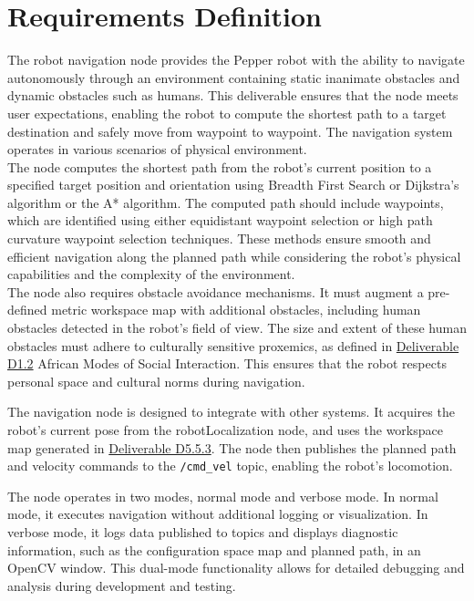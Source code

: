 \documentclass{CSSRforAfrica}
\begin{document}
\newpage

\section{Requirements Definition}
The robot navigation node provides the Pepper robot with the ability to navigate autonomously through an environment containing static inanimate obstacles and dynamic obstacles such as humans. This deliverable ensures that the node meets user expectations, enabling the robot to compute the shortest path to a target destination and safely move from waypoint to waypoint. The navigation system operates in various scenarios of physical environment. \\

\noindent The node computes the shortest path from the robot's current position to a specified target position and orientation using Breadth First Search or Dijkstra’s algorithm or the A* algorithm. The computed path should include waypoints, which are identified using either equidistant waypoint selection or high path curvature waypoint selection techniques. These methods ensure smooth and efficient navigation along the planned path while considering the robot’s physical capabilities and the complexity of the environment.\\

\noindent The node also requires obstacle avoidance mechanisms. It must augment a pre-defined metric workspace map with additional obstacles, including human obstacles detected in the robot's field of view. The size and extent of these human obstacles must adhere to culturally sensitive proxemics, as defined in \href{https://cssr4africa.github.io/deliverables/CSSR4Africa_Deliverable_D1.2.pdf}{Deliverable D1.2} African Modes of Social Interaction. This ensures that the robot respects personal space and cultural norms during navigation.


\noindent The navigation node is designed to integrate with other systems. It acquires the robot’s current pose from the robotLocalization node, and uses the workspace map generated in \href{https://cssr4africa.github.io/deliverables/CSSR4Africa_Deliverable_D5.5.3.pdf}{Deliverable D5.5.3}. The node then publishes the planned path and velocity commands to the \texttt{/cmd\_vel} topic, enabling the robot’s locomotion.

\noindent The node operates in two modes, normal mode and verbose mode. In normal mode, it executes navigation without additional logging or visualization. In verbose mode, it logs data published to topics and displays diagnostic information, such as the configuration space map and planned path, in an OpenCV window. This dual-mode functionality allows for detailed debugging and analysis during development and testing.
\end{document}
